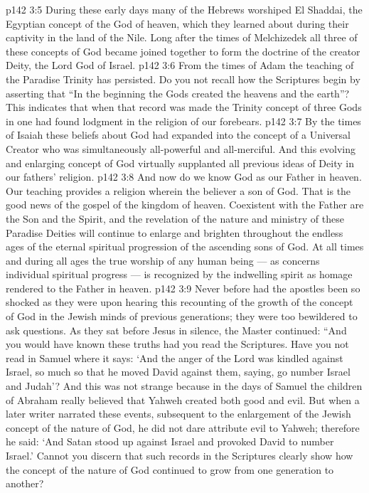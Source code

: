 \vs p142 3:5 \pc {}\bibnobreakspace {} During these early days many of the Hebrews worshiped El Shaddai, the Egyptian concept of the God of heaven, which they learned about during their captivity in the land of the Nile. Long after the times of Melchizedek all three of these concepts of God became joined together to form the doctrine of the creator Deity, the Lord God of Israel.
\vs p142 3:6 \pc {}\bibnobreakspace {} From the times of Adam the teaching of the Paradise Trinity has persisted. Do you not recall how the Scriptures begin by asserting that “In the beginning the Gods created the heavens and the earth”? This indicates that when that record was made the Trinity concept of three Gods in one had found lodgment in the religion of our forebears.
\vs p142 3:7 \pc {}\bibnobreakspace {} By the times of Isaiah these beliefs about God had expanded into the concept of a Universal Creator who was simultaneously all\hyp{}powerful and all\hyp{}merciful. And this evolving and enlarging concept of God virtually supplanted all previous ideas of Deity in our fathers’ religion.
\vs p142 3:8 \pc {}\bibnobreakspace {} And now do we know God as our Father in heaven. Our teaching provides a religion wherein the believer  a son of God. That is the good news of the gospel of the kingdom of heaven. Coexistent with the Father are the Son and the Spirit, and the revelation of the nature and ministry of these Paradise Deities will continue to enlarge and brighten throughout the endless ages of the eternal spiritual progression of the ascending sons of God. At all times and during all ages the true worship of any human being --- as concerns individual spiritual progress --- is recognized by the indwelling spirit as homage rendered to the Father in heaven.
\vs p142 3:9 \pc Never before had the apostles been so shocked as they were upon hearing this recounting of the growth of the concept of God in the Jewish minds of previous generations; they were too bewildered to ask questions. As they sat before Jesus in silence, the Master continued: \textcolor{ubdarkred}{“And you would have known these truths had you read the Scriptures. Have you not read in Samuel where it says: ‘And the anger of the Lord was kindled against Israel, so much so that he moved David against them, saying, go number Israel and Judah’? And this was not strange because in the days of Samuel the children of Abraham really believed that Yahweh created both good and evil. But when a later writer narrated these events, subsequent to the enlargement of the Jewish concept of the nature of God, he did not dare attribute evil to Yahweh; therefore he said: ‘And Satan stood up against Israel and provoked David to number Israel.’ Cannot you discern that such records in the Scriptures clearly show how the concept of the nature of God continued to grow from one generation to another?}
